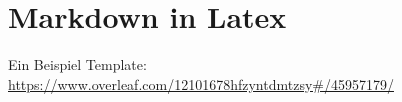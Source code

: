 \chapter{Markdown in Latex}

Ein Beispiel Template: \url{https://www.overleaf.com/12101678hfzyntdmtzsy#/45957179/}